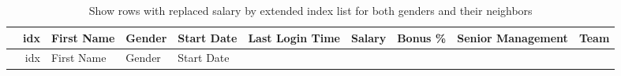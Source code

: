 \documentclass [oneside,10pt,a4paper,ngerman,BCOR10mm,headsepline,parindent,final]{scrartcl}
\begin{document}
    \begin{longtable}[]{@{}rrllllrrll@{}}
\caption{Show rows with replaced salary by extended index list for both
genders and their neighbors}\tabularnewline
\toprule
\begin{minipage}[b]{0.02\columnwidth}\raggedleft
\strut
\end{minipage} & \begin{minipage}[b]{0.04\columnwidth}\raggedleft
idx\strut
\end{minipage} & \begin{minipage}[b]{0.08\columnwidth}\raggedright
First Name\strut
\end{minipage} & \begin{minipage}[b]{0.06\columnwidth}\raggedright
Gender\strut
\end{minipage} & \begin{minipage}[b]{0.08\columnwidth}\raggedright
Start Date\strut
\end{minipage} & \begin{minipage}[b]{0.11\columnwidth}\raggedright
Last Login Time\strut
\end{minipage} & \begin{minipage}[b]{0.06\columnwidth}\raggedleft
Salary\strut
\end{minipage} & \begin{minipage}[b]{0.06\columnwidth}\raggedleft
Bonus \%\strut
\end{minipage} & \begin{minipage}[b]{0.12\columnwidth}\raggedright
Senior Management\strut
\end{minipage} & \begin{minipage}[b]{0.10\columnwidth}\raggedright
Team\strut
\end{minipage}\tabularnewline
\midrule
\endfirsthead
\toprule
\begin{minipage}[b]{0.02\columnwidth}\raggedleft
\strut
\end{minipage} & \begin{minipage}[b]{0.04\columnwidth}\raggedleft
idx\strut
\end{minipage} & \begin{minipage}[b]{0.08\columnwidth}\raggedright
First Name\strut
\end{minipage} & \begin{minipage}[b]{0.06\columnwidth}\raggedright
Gender\strut
\end{minipage} & \begin{minipage}[b]{0.08\columnwidth}\raggedright
Start Date\strut

\end{minipage}
\end{longtable}
\end{document}
